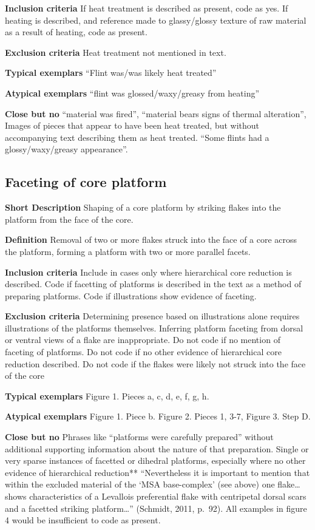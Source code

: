 \documentclass[
]{article}
\begin{document}
\textbf{Inclusion criteria} If heat treatment is described as present,
code as yes. If heating is described, and reference made to
glassy/glossy texture of raw material as a result of heating, code as
present.

\textbf{Exclusion criteria} Heat treatment not mentioned in text.

\textbf{Typical exemplars} ``Flint was/was likely heat treated''

\textbf{Atypical exemplars} ``flint was glossed/waxy/greasy from
heating''

\textbf{Close but no} ``material was fired'', ``material bears signs of
thermal alteration'', Images of pieces that appear to have been heat
treated, but without accompanying text describing them as heat treated.
``Some flints had a glossy/waxy/greasy appearance''.

\hypertarget{faceting-of-core-platform}{%
\subsection{Faceting of core platform}\label{faceting-of-core-platform}}

\textbf{Short Description} Shaping of a core platform by striking flakes
into the platform from the face of the core.

\textbf{Definition} Removal of two or more flakes struck into the face
of a core across the platform, forming a platform with two or more
parallel facets.

\textbf{Inclusion criteria} Include in cases only where hierarchical
core reduction is described. Code if facetting of platforms is described
in the text as a method of preparing platforms. Code if illustrations
show evidence of faceting.

\textbf{Exclusion criteria} Determining presence based on illustrations
alone requires illustrations of the platforms themselves. Inferring
platform faceting from dorsal or ventral views of a flake are
inappropriate. Do not code if no mention of faceting of platforms. Do
not code if no other evidence of hierarchical core reduction described.
Do not code if the flakes were likely not struck into the face of the
core

\textbf{Typical exemplars} Figure 1. Pieces a, c, d, e, f, g, h.

\textbf{Atypical exemplars} Figure 1. Piece b. Figure 2. Pieces 1, 3-7,
Figure 3. Step D.

\textbf{Close but no} Phrases like ``platforms were carefully prepared''
without additional supporting information about the nature of that
preparation. Single or very sparse instances of facetted or dihedral
platforms, especially where no other evidence of hierarchical
reduction** ``Nevertheless it is important to mention that within the
excluded material of the `MSA base-complex' (see above) one
flake\ldots{} shows characteristics of a Levallois preferential flake
with centripetal dorsal scars and a facetted striking platform\ldots{}''
(Schmidt, 2011, p.~92). All examples in figure 4 would be insufficient
to code as present.
\end{document}
